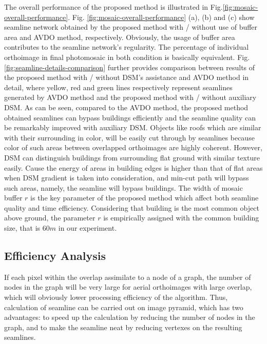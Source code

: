 \documentclass[journal]{IEEEtran}
\begin{document}
The overall performance of the proposed method is illustrated in Fig.\ref{fig:mosaic-overall-performance}. Fig. \ref{fig:mosaic-overall-performance} (a), (b) and (c) show seamline network obtained by the proposed method with / without use of buffer area and AVDO method, respectively. Obviously, the usage of buffer area contributes to the seamline network's regularity. The percentage of individual orthoimage in final photomosaic in both condition is basically equivalent.  Fig.\ref{fig:seamline-details-comparison} further provides comparison between results of the proposed method with / without DSM's assistance and AVDO method in detail, where yellow, red and green lines respectively represent seamlines generated by AVDO method and the proposed method with / without auxiliary DSM. As can be seen, compared to the AVDO method, the proposed method obtained seamlines can bypass buildings efficiently and the  seamline quality can be remarkably improved with auxiliary DSM. Objects like roofs which are similar with their surrounding in color, will be easily cut through by seamlines because color of such areas between overlapped orthoimages are highly coherent. However, DSM can distinguish buildings from surrounding flat ground with similar texture easily. Cause the energy of areas in building edges is higher than that of flat areas when DSM gradient is taken into consideration, and min-cut path will bypass such areas, namely, the seamline will bypass buildings. The width of mosaic buffer $r$ is the key parameter of the proposed method which affect both seamline quality and time efficiency. Considering that building is the most common object above ground, the parameter $r$ is empirically assigned with the common building size, that is $60m$ in our experiment.
\subsection{Efficiency Analysis}
If each pixel within the overlap assimilate to a node of a graph, the number of nodes in the graph will be very large for aerial orthoimages with large overlap, which will obviously lower processing efficiency of the algorithm. Thus, calculation of seamline can be carried out on image pyramid, which has two advantages: to speed up the calculation by reducing the number of nodes in the graph, and to make the seamline neat by reducing vertexes on the resulting seamlines.
\end{document}
